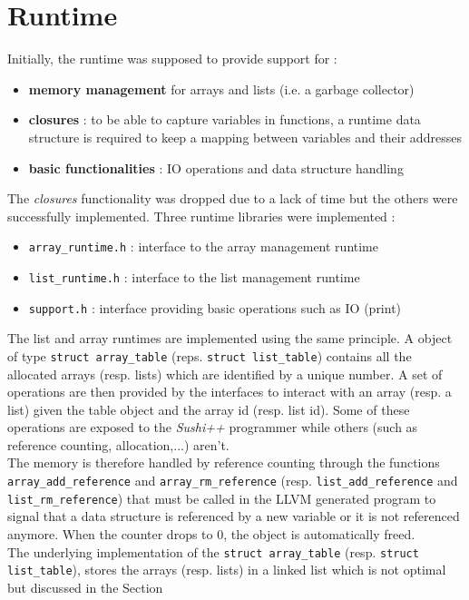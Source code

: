 \documentclass[a4paper,11pt]{article}
\begin{document}
\section{Runtime}
\label{sec:runtime}
Initially, the runtime was supposed to provide support for :
\begin{itemize}
	\item \textbf{memory management} for arrays and lists (i.e. a garbage collector)
	\item \textbf{closures} : to be able to capture variables in functions, a runtime data structure is required to keep a mapping between variables and their addresses
	\item \textbf{basic functionalities} : IO operations and data structure handling
\end{itemize}
The \textit{closures} functionality was dropped due to a lack of time but the others were successfully implemented. Three runtime libraries were implemented :
\begin{itemize}
	\item \texttt{array\_runtime.h} : interface to the array management runtime
	\item \texttt{list\_runtime.h} : interface to the list management runtime
	\item \texttt{support.h} : interface providing basic operations such as IO (print)
\end{itemize}
The list and array runtimes are implemented using the same principle. A object of type \texttt{struct array\_table} (reps. \texttt{struct list\_table}) contains all the allocated arrays (resp. lists) which are identified by a unique number. A set of operations are then provided by the interfaces to interact with an array (resp. a list) given the table object and the array id (resp. list id). Some of these operations are exposed to the \textit{Sushi++} programmer while others (such as reference counting, allocation,...) aren't.
\\
The memory is therefore handled by reference counting through the functions \texttt{array\_add\_reference} and \texttt{array\_rm\_reference} (resp. \texttt{list\_add\_reference} and \texttt{list\_rm\_reference}) that must be called in the LLVM generated program to signal that a data structure is referenced by a new variable or it is not referenced anymore. When the counter drops to 0, the object is automatically freed.
\\
The underlying implementation of the \texttt{struct array\_table} (resp. \texttt{struct list\_table}), stores the arrays (resp. lists) in a linked list which is not optimal but discussed in the Section \
\end{document}
